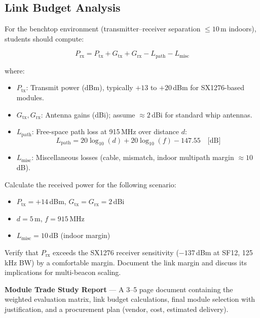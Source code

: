 \documentclass[11pt,letterpaper]{article}
\begin{document}
	\subsection{Link Budget Analysis}
	
	For the benchtop environment (transmitter--receiver separation $\leq 10$\,m indoors), students should compute:
	
	\begin{equation}
		P_{\text{rx}} = P_{\text{tx}} + G_{\text{tx}} + G_{\text{rx}} - L_{\text{path}} - L_{\text{misc}}
		\label{eq:linkbudget}
	\end{equation}
	
	where:
	\begin{itemize}[leftmargin=2em]
		\item $P_{\text{tx}}$: Transmit power (dBm), typically $+13$ to $+20$\,dBm for SX1276-based modules.
		\item $G_{\text{tx}}, G_{\text{rx}}$: Antenna gains (dBi); assume $\approx 2$\,dBi for standard whip antennas.
		\item $L_{\text{path}}$: Free-space path loss at 915\,MHz over distance $d$:
		\begin{equation}
			L_{\text{path}} = 20\log_{10}(d) + 20\log_{10}(f) - 147.55 \quad \text{[dB]}
		\end{equation}
		\item $L_{\text{misc}}$: Miscellaneous losses (cable, mismatch, indoor multipath margin $\approx 10$\,dB).
	\end{itemize}
	
	\begin{tcolorbox}[infobox={Exercise: Link Budget Worksheet}]
		Calculate the received power for the following scenario:
		\begin{itemize}
			\item $P_{\text{tx}} = +14$\,dBm, $G_{\text{tx}} = G_{\text{rx}} = 2$\,dBi
			\item $d = 5$\,m, $f = 915$\,MHz
			\item $L_{\text{misc}} = 10$\,dB (indoor margin)
		\end{itemize}
		Verify that $P_{\text{rx}}$ exceeds the SX1276 receiver sensitivity ($-137$\,dBm at SF12, 125\,kHz BW) by a comfortable margin. Document the link margin and discuss its implications for multi-beacon scaling.
	\end{tcolorbox}
	
	\begin{tcolorbox}[deliverable={Week 1 Deliverable}]
		\textbf{\RF{} Module Trade Study Report} --- A 3--5 page document containing the weighted evaluation matrix, link budget calculations, final module selection with justification, and a procurement plan (vendor, cost, estimated delivery).
	\end{tcolorbox}
	
\end{document}
